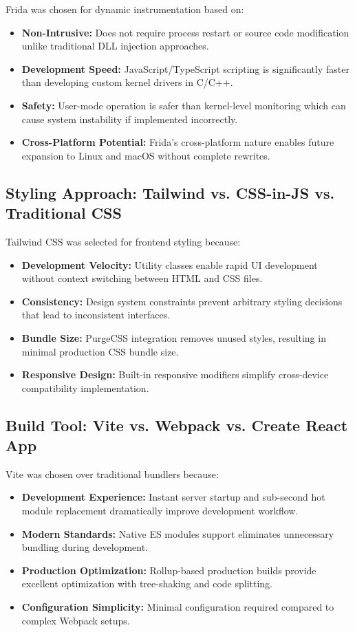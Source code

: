 Frida was chosen for dynamic instrumentation based on:

\begin{itemize}
    \item \textbf{Non-Intrusive:} Does not require process restart or source code modification unlike traditional DLL injection approaches.
    \item \textbf{Development Speed:} JavaScript/TypeScript scripting is significantly faster than developing custom kernel drivers in C/C++.
    \item \textbf{Safety:} User-mode operation is safer than kernel-level monitoring which can cause system instability if implemented incorrectly.
    \item \textbf{Cross-Platform Potential:} Frida's cross-platform nature enables future expansion to Linux and macOS without complete rewrites.
\end{itemize}

\subsection{Styling Approach: Tailwind vs. CSS-in-JS vs. Traditional CSS}

Tailwind CSS was selected for frontend styling because:

\begin{itemize}
    \item \textbf{Development Velocity:} Utility classes enable rapid UI development without context switching between HTML and CSS files.
    \item \textbf{Consistency:} Design system constraints prevent arbitrary styling decisions that lead to inconsistent interfaces.
    \item \textbf{Bundle Size:} PurgeCSS integration removes unused styles, resulting in minimal production CSS bundle size.
    \item \textbf{Responsive Design:} Built-in responsive modifiers simplify cross-device compatibility implementation.
\end{itemize}

\subsection{Build Tool: Vite vs. Webpack vs. Create React App}

Vite was chosen over traditional bundlers because:

\begin{itemize}
    \item \textbf{Development Experience:} Instant server startup and sub-second hot module replacement dramatically improve development workflow.
    \item \textbf{Modern Standards:} Native ES modules support eliminates unnecessary bundling during development.
    \item \textbf{Production Optimization:} Rollup-based production builds provide excellent optimization with tree-shaking and code splitting.
    \item \textbf{Configuration Simplicity:} Minimal configuration required compared to complex Webpack setups.
\end{itemize}

